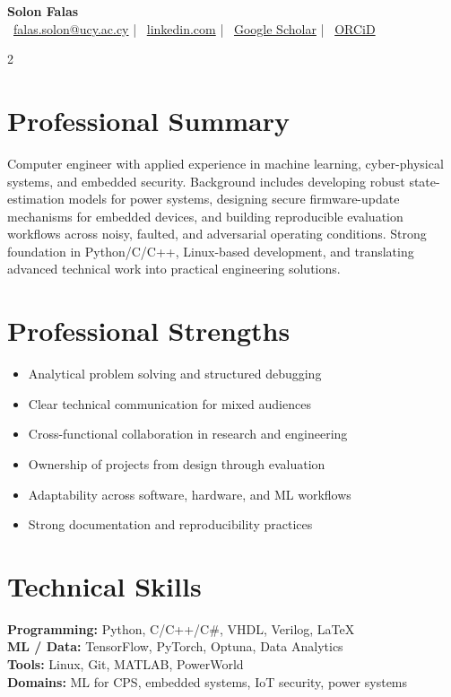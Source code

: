 \documentclass[10pt,a4paper]{article}
\begin{document}
\pagestyle{empty}

\begin{center}
  {\Large \textbf{Solon Falas}}\\[2pt]
  \footnotesize
  \faEnvelope\ \href{mailto:falas.solon@ucy.ac.cy}{falas.solon@ucy.ac.cy}
  \quad|\quad
  \faLinkedin\ \href{https://www.linkedin.com/in/solon-falas/}{linkedin.com}
  \quad|\quad
  \faGraduationCap\ \href{https://scholar.google.com/citations?user=C1OPsJIAAAAJ}{Google Scholar}
  \quad|\quad
  \faOrcid\ \href{https://orcid.org/0000-0003-1182-4382}{ORCiD}
\end{center}

\vspace{0.2em}
\small

\begin{multicols}{2}

\section*{Professional Summary}
Computer engineer with applied experience in machine learning, cyber-physical systems, and embedded security. Background includes developing robust state-estimation models for power systems, designing secure firmware-update mechanisms for embedded devices, and building reproducible evaluation workflows across noisy, faulted, and adversarial operating conditions. Strong foundation in Python/C/C++, Linux-based development, and translating advanced technical work into practical engineering solutions.

\section*{Professional Strengths}
\begin{itemize}
    \item Analytical problem solving and structured debugging
    \item Clear technical communication for mixed audiences
    \item Cross-functional collaboration in research and engineering
    \item Ownership of projects from design through evaluation
    \item Adaptability across software, hardware, and ML workflows
    \item Strong documentation and reproducibility practices
\end{itemize}

\section*{Technical Skills}
\textbf{Programming:} Python, C/C++/C\#, VHDL, Verilog, \LaTeX\\[2pt]
\textbf{ML / Data:} TensorFlow, PyTorch, Optuna, Data Analytics\\[2pt]
\textbf{Tools:} Linux, Git, MATLAB, PowerWorld\\[2pt]
\textbf{Domains:} ML for CPS, embedded systems, IoT security, power systems


\end{multicols}
\end{document}
